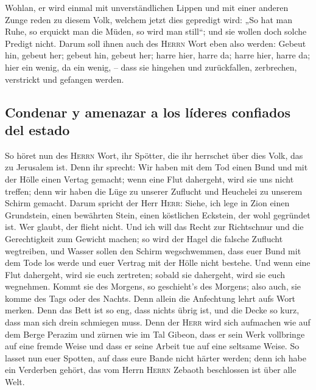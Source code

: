  Wohlan, er wird einmal mit unverständlichen Lippen und
mit einer anderen Zunge reden zu diesem Volk, welchem jetzt dies
gepredigt wird:  „So hat man Ruhe, so erquickt man die
Müden, so wird man still``; und sie wollen doch solche Predigt nicht.
 Darum soll ihnen auch des \textsc{Herrn} Wort eben also
werden: Gebeut hin, gebeut her; gebeut hin, gebeut her; harre hier,
harre da; harre hier, harre da; hier ein wenig, da ein wenig, -- dass
sie hingehen und zurückfallen, zerbrechen, verstrickt und gefangen
werden.

\hypertarget{condenar-y-amenazar-a-los-luxedderes-confiados-del-estado}{%
\subsection{Condenar y amenazar a los líderes confiados del
estado}\label{condenar-y-amenazar-a-los-luxedderes-confiados-del-estado}}

 So höret nun des \textsc{Herrn} Wort, ihr Spötter, die
ihr herrschet über dies Volk, das zu Jerusalem ist.  Denn
ihr sprecht: Wir haben mit dem Tod einen Bund und mit der Hölle einen
Vertag gemacht; wenn eine Flut dahergeht, wird sie uns nicht treffen;
denn wir haben die Lüge zu unserer Zuflucht und Heuchelei zu unserem
Schirm gemacht.  Darum spricht der Herr \textsc{Herr}:
Siehe, ich lege in Zion einen Grundstein, einen bewährten Stein, einen
köstlichen Eckstein, der wohl gegründet ist. Wer glaubt, der flieht
nicht.  Und ich will das Recht zur Richtschnur und die
Gerechtigkeit zum Gewicht machen; so wird der Hagel die falsche Zuflucht
wegtreiben, und Wasser sollen den Schirm wegschwemmen, 
dass euer Bund mit dem Tode los werde und euer Vertrag mit der Hölle
nicht bestehe. Und wenn eine Flut dahergeht, wird sie euch zertreten;
sobald sie dahergeht, wird sie euch wegnehmen.  Kommt sie
des Morgens, so geschieht's des Morgens; also auch, sie komme des Tags
oder des Nachts. Denn allein die Anfechtung lehrt aufs Wort merken.
 Denn das Bett ist so eng, dass nichts übrig ist, und die
Decke so kurz, dass man sich drein schmiegen muss.  Denn
der \textsc{Herr} wird sich aufmachen wie auf dem Berge Perazim und
zürnen wie im Tal Gibeon, dass er sein Werk vollbringe auf eine fremde
Weise und dass er seine Arbeit tue auf eine seltsame Weise.
 So lasset nun euer Spotten, auf dass eure Bande nicht
härter werden; denn ich habe ein Verderben gehört, das vom Herrn
\textsc{Herrn} Zebaoth beschlossen ist über alle Welt.

